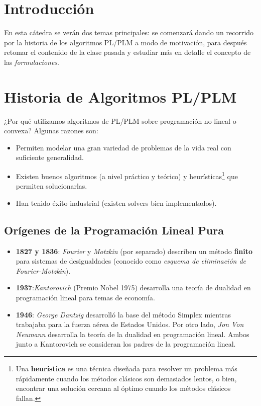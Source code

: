 
\renewcommand{\sca}{Matías Azócar}
\renewcommand{\scb}{Carolina Chiu}
\renewcommand{\scc}{Francisco Muñoz}
\renewcommand{\catnum}{2} %
\renewcommand{\fecha}{23 de marzo de 2020}


% 


\section*{Introducción}

En esta cátedra se verán dos temas principales: se comenzará dando un recorrido por la historia de los algoritmos PL/PLM a modo de motivación, para después retomar el contenido de la clase pasada y estudiar más en detalle el concepto de las \textit{formulaciones}.

\section{Historia de Algoritmos PL/PLM}
¿Por qué utilizamos algoritmos de PL/PLM sobre programación no lineal o convexa? Algunas razones son:
\begin{itemize}
    \item Permiten modelar una gran variedad de problemas de la vida real con suficiente generalidad.
    \item Existen buenos algoritmos (a nivel práctico y teórico) y heurísticas\footnote{Una \textbf{heurística} es una técnica diseñada para resolver un problema más rápidamente cuando los métodos clásicos son demasiados lentos, o bien, encontrar una solución cercana al óptimo cuando los métodos clásicos fallan.} que permiten solucionarlas.
    \item Han tenido éxito industrial (existen solvers bien implementados).
\end{itemize}

\subsection*{Orígenes de la Programación Lineal Pura}
\begin{itemize}
    \item \textbf{1827 y 1836}: \textit{Fourier} y \textit{Motzkin} (por separado) describen un método \textbf{finito} para sistemas de desigualdades (conocido como \textit{esquema de eliminación de Fourier-Motzkin}).
    \item \textbf{1937}:\textit{Kantorovich} (Premio Nobel 1975) desarrolla una teoría de dualidad en programación lineal para temas de economía. 
    \item \textbf{1946}: \textit{George Dantzig} desarrolló la base del método Simplex mientras trabajaba para la fuerza aérea de Estados Unidos. Por otro lado, \textit{Jon Von Neumann} desarrolla la teoría de la dualidad en programación lineal.  Ambos junto a Kantorovich se consideran los padres de la programación lineal.
\end{itemize}

